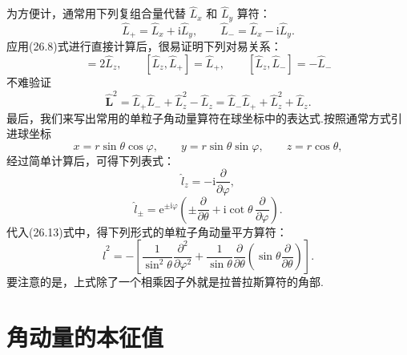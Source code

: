 为方便计，通常用下列复组合量代替 $\hat{L}_x$ 和 $\hat{L}_y$ 算符：
\begin{equation}
  \hat{L}_+=\hat{L}_x+\mathrm{i}\hat{L}_y,\qquad
  \hat{L}_-=\hat{L}_x-\mathrm{i}\hat{L}_y.
\end{equation}
应用(26.8)式进行直接计算后，很易证明下列对易关系：
\begin{equation}
  [\hat{L}_+,\hat{L}_-]=2\hat{L}_z,\qquad
  [\hat{L}_z,\hat{L}_+]=\hat{L}_+,\qquad
  [\hat{L}_z,\hat{L}_-]=-\hat{L}_-
\end{equation}
不难验证
\begin{equation}
  \hat{\boldsymbol{L}}^2=\hat{L}_+\hat{L}_-+\hat{L}_z^2-\hat{L}_z
  =\hat{L}_-\hat{L}_++\hat{L}_z^2+\hat{L}_z.
\end{equation}
最后，我们来写出常用的单粒子角动量算符在球坐标中的表达式.按照通常方式引进球坐标
\begin{equation*}
  x=r\sin\theta\cos\varphi,\qquad
  y=r\sin\theta\sin\varphi,\qquad
  z=r\cos\theta,
\end{equation*}
经过简单计算后，可得下列表式：
\begin{equation}
  \hat{l}_z=-\mathrm{i}\frac{\partial}{\partial\varphi},
\end{equation}
\begin{equation}
  \hat{l}_{\pm}=\mathrm{e}^{\pm\mathrm{i}\varphi}
  \left(\pm\frac{\partial}{\partial\theta}
  +\mathrm{i}\cot\theta\,\frac{\partial}{\partial\varphi}\right).
\end{equation}
代入(26.13)式中，得下列形式的单粒子角动量平方算符：
\begin{equation}
  \hat{l}^2=-\left[\frac{1}{\sin^2\theta}
  \frac{\partial^2}{\partial\varphi^2}
  +\frac{1}{\sin\theta}\frac{\partial}{\partial\theta}
  \left(\sin\theta\frac{\partial}{\partial\theta}\right)\right].
\end{equation}
要注意的是，上式除了一个相乘因子外就是拉普拉斯算符的角部.

\section{角动量的本征值}

